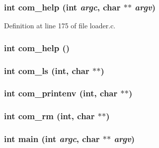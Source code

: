 \subsubsection[{com\_\-help}]{\setlength{\rightskip}{0pt plus 5cm}int com\_\-help (int {\em argc}, \/  char $\ast$$\ast$ {\em argv})}\label{loader_8c_a89e66db614c7e1e44efab980c0967bec}


Definition at line 175 of file loader.c.

\subsubsection[{com\_\-help}]{\setlength{\rightskip}{0pt plus 5cm}int com\_\-help ()}\label{loader_8c_add232c49d70c7dfb7b1c5edbf8f51e77}
\subsubsection[{com\_\-ls}]{\setlength{\rightskip}{0pt plus 5cm}int com\_\-ls (int, \/  char $\ast$$\ast$)}\label{loader_8c_aeb855dbeadb97524f3527a7cce6b2f2d}
\subsubsection[{com\_\-printenv}]{\setlength{\rightskip}{0pt plus 5cm}int com\_\-printenv (int, \/  char $\ast$$\ast$)}\label{loader_8c_a15bfa7b867cca71cdfdcfd908cfd09de}
\subsubsection[{com\_\-rm}]{\setlength{\rightskip}{0pt plus 5cm}int com\_\-rm (int, \/  char $\ast$$\ast$)}\label{loader_8c_a2dbd9935df68a2a03fa57f52da8ab458}
\subsubsection[{main}]{\setlength{\rightskip}{0pt plus 5cm}int main (int {\em argc}, \/  char $\ast$$\ast$ {\em argv})}\label{loader_8c_a3c04138a5bfe5d72780bb7e82a18e627}


